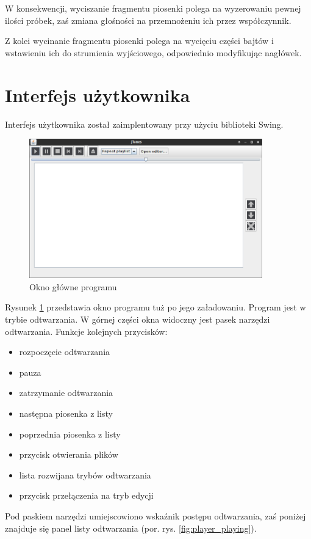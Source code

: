 \documentclass[12pt,a4paper,notitlepage]{article}
\begin{document}
W konsekwencji, wyciszanie fragmentu piosenki polega na wyzerowaniu pewnej ilości próbek, zaś zmiana głośności na przemnożeniu ich przez współczynnik. 

Z kolei wycinanie fragmentu piosenki polega na wycięciu części bajtów i wstawieniu ich do strumienia wyjściowego, odpowiednio modyfikując nagłówek.

\section{Interfejs użytkownika}
\label{sec:Interfejs}
Interfejs użytkownika został zaimplentowany przy użyciu biblioteki Swing.

\begin{figure}[hb]
 \centering
 \includegraphics[width=0.9\textwidth]{img/player_blank.png}
 \caption{Okno główne programu}
 \label{fig:player_blank}
\end{figure}

Rysunek \ref{fig:player_blank} przedstawia okno programu tuż po jego załadowaniu. Program jest w trybie odtwarzania. W górnej części okna widoczny jest pasek narzędzi odtwarzania. Funkcje kolejnych
przycisków:
\begin{itemize}
 \item rozpoczęcie odtwarzania
 \item pauza
 \item zatrzymanie odtwarzania
 \item następna piosenka z listy
 \item poprzednia piosenka z listy
 \item przycisk otwierania plików
 \item lista rozwijana trybów odtwarzania
 \item przycisk przełączenia na tryb edycji
\end{itemize}
Pod paskiem narzędzi umiejscowiono wskaźnik postępu odtwarzania, zaś poniżej znajduje się panel listy odtwarzania (por. rys. \ref{fig:player_playing}).
\end{document}

